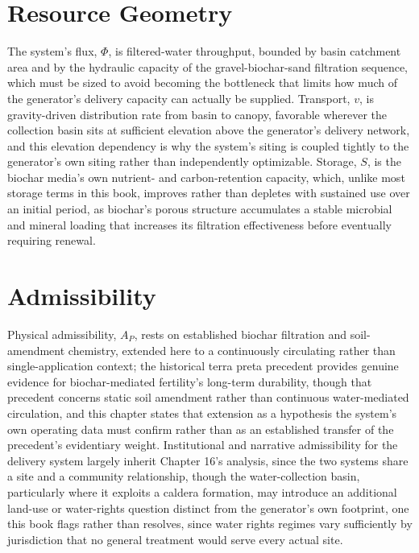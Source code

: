 \documentclass[11pt,oneside]{book}
\begin{document}
\section*{Resource Geometry}

The system's flux, $\Phi$, is filtered-water throughput, bounded by basin catchment area and by the hydraulic capacity of the gravel-biochar-sand filtration sequence, which must be sized to avoid becoming the bottleneck that limits how much of the generator's delivery capacity can actually be supplied. Transport, $v$, is gravity-driven distribution rate from basin to canopy, favorable wherever the collection basin sits at sufficient elevation above the generator's delivery network, and this elevation dependency is why the system's siting is coupled tightly to the generator's own siting rather than independently optimizable. Storage, $S$, is the biochar media's own nutrient- and carbon-retention capacity, which, unlike most storage terms in this book, improves rather than depletes with sustained use over an initial period, as biochar's porous structure accumulates a stable microbial and mineral loading that increases its filtration effectiveness before eventually requiring renewal.

\section*{Admissibility}

Physical admissibility, $A_P$, rests on established biochar filtration and soil-amendment chemistry, extended here to a continuously circulating rather than single-application context; the historical terra preta precedent provides genuine evidence for biochar-mediated fertility's long-term durability, though that precedent concerns static soil amendment rather than continuous water-mediated circulation, and this chapter states that extension as a hypothesis the system's own operating data must confirm rather than as an established transfer of the precedent's evidentiary weight. Institutional and narrative admissibility for the delivery system largely inherit Chapter 16's analysis, since the two systems share a site and a community relationship, though the water-collection basin, particularly where it exploits a caldera formation, may introduce an additional land-use or water-rights question distinct from the generator's own footprint, one this book flags rather than resolves, since water rights regimes vary sufficiently by jurisdiction that no general treatment would serve every actual site.
\end{document}
